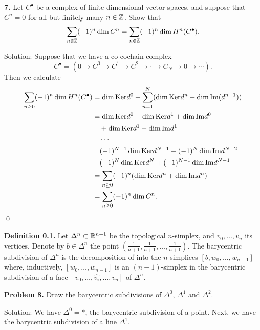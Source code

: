 \begin{dang}
\textbf{7.} Let \(C^{\bullet}\) be a complex of finite dimensional vector spaces, and suppose that \(C^{n} = 0\) for all but finitely many \(n\in \mathbb{Z}\). Show that
    \[
    \sum_{n\in \mathbb{Z}}(-1)^{n}\dim C^{n} = \sum_{n\in \mathbb{Z}}(-1)^{n}\dim H^{n}(C^{\bullet}).
    \]
\end{dang}
Solution: Suppose that we have a co-cochain complex 
\begin{equation}
    C^\bullet =(0\to C^0\to C^1\to C^2\to \cdot\to C_N\to 0\to\cdots).
\end{equation}
Then we calculate
\begin{equation}
    \begin{split}
        \sum_{n\geq0}(-1)^n\dim H^n(C^\bullet) &=
        \dim\text{Ker} d^0 +\sum_{n=1}^N(\dim\text{Ker} d^n - \dim\text{Im}(d^{n-1}))\\
        &=\dim\text{Ker} d^0 - \dim\text{Ker} d^1 + \dim\text{Im}d^0\\
        &\quad+\dim\text{Ker} d^1 -\dim\text{Im}d^1\\
        &\quad\cdots \\
        &\quad(-1)^{N-1}\dim\text{Ker} d^{N-1} +(-1)^N\dim\text{Im}d^{N-2}\\
        &\quad(-1)^N\dim\text{Ker} d^N + (-1)^{N-1}\dim\text{Im}d^{N-1}\\
        &=\sum_{n\geq0}(-1)^n(\dim\text{Ker} d^n + \dim\text{Im}d^n)\\
        &=\sum_{n\geq0}(-1)^n\dim C^n.
    \end{split}
\end{equation}
\qed

\noindent \textbf{Definition 0.1.} Let \(\Delta^n\subset \mathbb{R}^{n + 1}\) be the topological \(n\)-simplex, and \(v_{0},\ldots ,v_{n}\) its vertices. Denote by \(b\in \Delta^n\) the point \((\frac{1}{n + 1},\frac{1}{n + 1},\ldots ,\frac{1}{n + 1})\). The barycentric subdivision of \(\Delta^n\) is the decomposition of into the \(n\)-simplices \([b,w_{0},\ldots ,w_{n - 1}]\) where, inductively, \([w_{0},\ldots ,w_{n - 1}]\) is an \((n - 1)\)-simplex in the barycentric subdivision of a face \([v_{0},\ldots ,\widehat{v_{i}},\ldots ,v_{n}]\) of \(\Delta^n\).

\begin{dang}
\textbf{Problem 8.} Draw the barycentric subdivisions of \(\Delta^0\), \(\Delta^1\) and \(\Delta^2\).
\end{dang}
Solution: We have $\Delta^0 = *$, the barycentric subdivision of a point. Next, 
we have the barycentric subdivision of a line $\Delta^1$.

